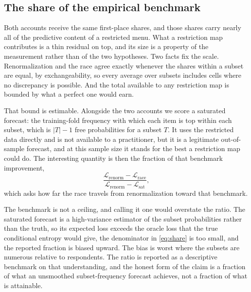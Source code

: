 \documentclass[11pt]{article}
\begin{document}
\subsection{The share of the empirical benchmark}
\label{sec:ceiling}

Both accounts receive the same first-place shares, and those shares carry nearly all
of the predictive content of a restricted menu. What a restriction map contributes is
a thin residual on top, and its size is a property of the measurement rather than of
the two hypotheses. Two facts fix the scale. Renormalization and the race agree
exactly whenever the shares within a subset are equal, by exchangeability, so every
average over subsets includes cells where no discrepancy is possible. And the total
available to any restriction map is bounded by what a perfect one would earn.

That bound is estimable. Alongside the two accounts we score a saturated forecast:
the training-fold frequency with which each item is top within each subset, which is
$|T|-1$ free probabilities for a subset $T$. It uses the restricted data directly and is not
available to a practitioner, but it is a legitimate out-of-sample forecast, and at
this sample size it stands for the best a restriction map could do. The interesting
quantity is then the fraction of that benchmark improvement,
\begin{equation}
\frac{\mathcal{L}_{\text{renorm}} - \mathcal{L}_{\text{race}}}
     {\mathcal{L}_{\text{renorm}} - \mathcal{L}_{\text{sat}}},
\label{eq:share}
\end{equation}
which asks how far the race travels from renormalization toward that benchmark.

The benchmark is not a ceiling, and calling it one would overstate the ratio. The
saturated forecast is a high-variance estimator of the subset probabilities rather
than the truth, so its expected loss exceeds the oracle loss that the true conditional
entropy would give, the denominator in \eqref{eq:share} is too small, and the reported
fraction is biased upward. The bias is worst where the subsets are numerous relative
to respondents. The ratio is reported as a descriptive benchmark on that
understanding, and the honest form of the claim is a fraction of what an unsmoothed
subset-frequency forecast achieves, not a fraction of what is attainable.
\end{document}
